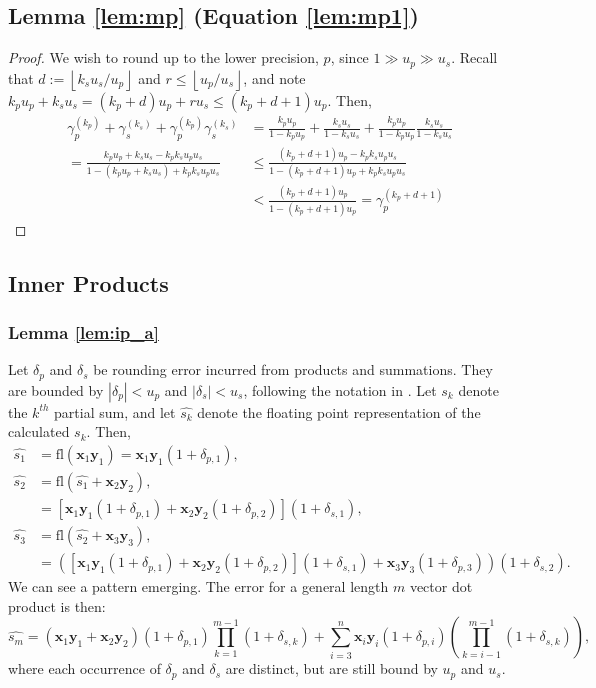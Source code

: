 \documentclass[review,onefignum,onetabnum]{siamart190516}
\newcommand{\dd}{\delta}
\newcommand{\bb}[1]{\mathbf{#1}}
\newcommand{\fl}{\mathrm{fl}}
\begin{document}
\subsection{Lemma \ref{lem:mp} (Equation \ref{lem:mp1})}
\begin{proof}
	We wish to round up to the lower precision, $p$, since $1\gg u_p \gg u_s$.  
	Recall that $d := \left\lfloor k_s u_s  / u_p \right\rfloor$ and $r \leq \left\lfloor u_p  / u_s \right\rfloor$,
	and note
	$ k_pu_p+k_su_s = (k_p+d)u_p + r u_s \leq (k_p+d+1)u_p$. Then,
	\begin{align*}
	\gamma_{p}^{(k_p)}+\gamma_{s}^{(k_s)}+\gamma_{p}^{(k_p)}\gamma_{s}^{(k_s)} 
	&= \frac{k_pu_p}{1-k_pu_p} + \frac{k_su_s}{1-k_su_s} + \frac{k_pu_p}{1-k_pu_p}\frac{k_su_s}{1-k_su_s} \\
	= \frac{k_pu_p+k_su_s-k_pk_su_pu_s}{1-(k_pu_p+k_su_s)+k_pk_su_pu_s} %
	&\leq \frac{(k_p+d+1)u_p-k_pk_su_pu_s}{1-(k_p+d+1)u_p+k_pk_su_pu_s} \\
	&< \frac{(k_p+d+1)u_p}{1-(k_p+d+1)u_p} = \gamma_{p}^{(k_p+d+1)}
	\end{align*}
\end{proof}

\subsection{Inner Products}
\label{appendix:IP}
\subsubsection{Lemma \ref{lem:ip_a}}
Let $\dd_p$ and $\dd_s$ be rounding error incurred from products and summations.
They are bounded by $|\dd_p| < u_p$ and $|\dd_s| < u_s$, following the notation in \cite{Higham2002}. Let $s_k$ denote the $k^{th}$ partial sum, and let $\hat{s_k}$ denote the floating point representation of the calculated $s_k$.
Then,
\begin{align*}
\hat{s_1} &= \fl (\bb{x}_1\bb{y}_1) = \bb{x}_1\bb{y}_1(1 + \dd_{p,1}),\\
\hat{s_2} &= \fl(\hat{s_1} + \bb{x}_2\bb{y}_2), \\
&= \left[\bb{x}_1\bb{y}_1(1 + \dd_{p,1}) + \bb{x}_2\bb{y}_2(1 + \dd_{p,2})\right](1+\dd_{s,1}),\\
\hat{s_3} &= \fl(\hat{s_2}+\bb{x}_3\bb{y}_3), \\
&= \left(\left[\bb{x}_1\bb{y}_1(1 + \dd_{p,1}) + \bb{x}_2\bb{y}_2(1 + \dd_{p,2})\right](1+\dd_{s,1})  + \bb{x}_3\bb{y}_3(1+\dd_{p,3})\right)(1+\dd_{s,2}).
\end{align*}
We can see a pattern emerging. 
The error for a general length $m$ vector dot product is then:
\begin{equation}
\label{eqn:dperr_1}
\hat{s_m} = (\bb{x}_1\bb{y}_1+\bb{x}_2\bb{y}_2)(1+ \dd_{p,1})\prod_{k=1}^{m-1}(1+\dd_{s,k}) + \sum_{i=3}^n \bb{x}_i\bb{y}_i(1+\dd_{p,i})\left(\prod_{k=i-1}^{m-1}(1+\dd_{s,k})\right),
\end{equation}
where each occurrence of $\dd_p$ and $\dd_s$ are distinct, but are still bound by $u_p$ and $u_s$.
\end{document}

